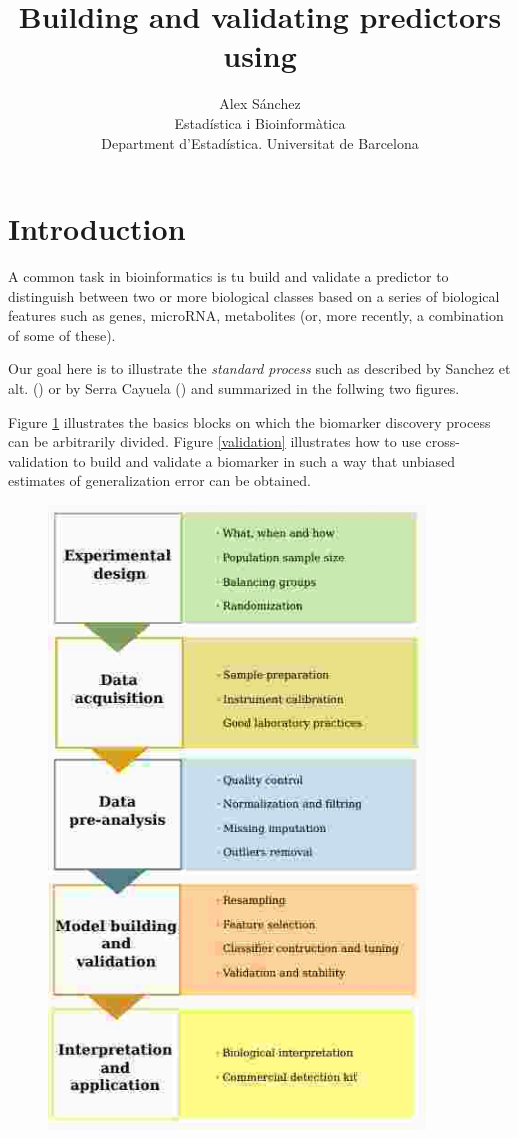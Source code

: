\documentclass{article}\usepackage[]{graphicx}\usepackage[]{color}
\title{Building and validating predictors using \R}
\author{Alex Sánchez\\
Estad\'istica i Bioinform\`atica\\
Department d'Estadística. Universitat de Barcelona}
\begin{document}
\section{Introduction}

A common task in bioinformatics is tu build and validate a predictor
to distinguish between two or more biological classes based on a
series of biological features such as genes, microRNA, metabolites (or,
more recently, a combination of some of these).

Our goal here is to illustrate the \emph{standard process} such as
described by Sanchez et alt. (\cite{Sanchez2013}) or by Serra Cayuela (\cite{SerraCayuela2015}) and summarized
in the follwing two figures.

Figure \ref{workflow} illustrates the basics blocks on which the biomarker discovery process can be arbitrarily divided. Figure \ref{validation} illustrates how to use cross-validation to build and validate a biomarker in such a way that unbiased estimates of generalization error can be obtained.

\begin{figure}
\includegraphics[width=10cm]{images/biomarkerDiscoveryWorkflow}
\label{workflow}
\end{figure}
\end{document}
